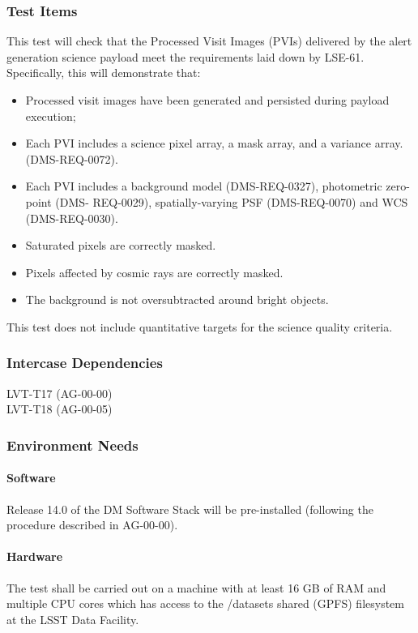 \subsubsection{Test Items}
This test will check that the Processed Visit Images (PVIs) delivered by
the alert generation science payload meet the requirements laid down by
LSE-61.\\
Specifically, this will demonstrate that:

\begin{itemize}
\tightlist
\item
  Processed visit images have been generated and persisted during
  payload execution;
\item
  Each PVI includes a science pixel array, a mask array, and a variance
  array. (DMS-REQ-0072).
\item
  Each PVI includes a background model (DMS-REQ-0327), photometric
  zero-point (DMS- REQ-0029), spatially-varying PSF (DMS-REQ-0070) and
  WCS (DMS-REQ-0030).
\item
  Saturated pixels are correctly masked.
\item
  Pixels affected by cosmic rays are correctly masked.
\item
  The background is not oversubtracted around bright objects.
\end{itemize}

This test does not include quantitative targets for the science quality
criteria.



\subsubsection{Intercase Dependencies}
LVT-T17 (AG-00-00)\\
LVT-T18 (AG-00-05)


\subsubsection{Environment Needs}

\paragraph{Software}
Release 14.0 of the DM Software Stack will be pre-installed (following
the procedure described in AG-00-00).


\paragraph{Hardware}
The test shall be carried out on a machine with at least 16 GB of RAM
and multiple CPU cores which has access to the /datasets shared (GPFS)
filesystem at the LSST Data Facility.


